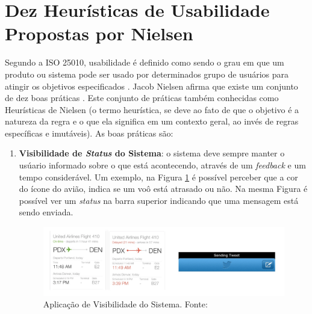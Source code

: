 \section{Dez Heurísticas de Usabilidade Propostas por Nielsen}
Segundo a ISO 25010, usabilidade é definido como sendo o grau em que um produto ou sistema pode ser usado por determinados grupo de usuários para atingir os objetivos especificados \cite{Square}. Jacob Nielsen afirma que existe um conjunto de dez boas práticas \cite{princ_usabilidade}. Este conjunto de práticas também conhecidas como Heurísticas de Nielsen (o termo heurística, se deve ao fato de que o objetivo é a natureza da regra e o que ela significa em um contexto geral, ao invés de regras específicas e imutáveis). As boas práticas são:

\begin{enumerate}

  \item\textbf{Visibilidade de \textit{Status} do Sistema}: o sistema deve sempre manter o usúario informado sobre o que está acontecendo, através de um \textit{feedback} e um tempo considerável. Um exemplo, na Figura \ref{img:princ1} é possível perceber que a cor do ícone do avião, indica se um voô está atrasado ou não. Na mesma Figura é possível ver um \textit{status} na barra superior indicando que uma mensagem está sendo enviada.
\graphicspath{{figuras/}}
  \begin{figure}[h!]
  \centering
  \includegraphics[scale=0.40]{princ_1.png}
  \caption{Aplicação de Visibilidade do Sistema. Fonte: \cite{pres_usabilidade}}
  \label{img:princ1}
  \end{figure}  
  

\end{enumerate}
